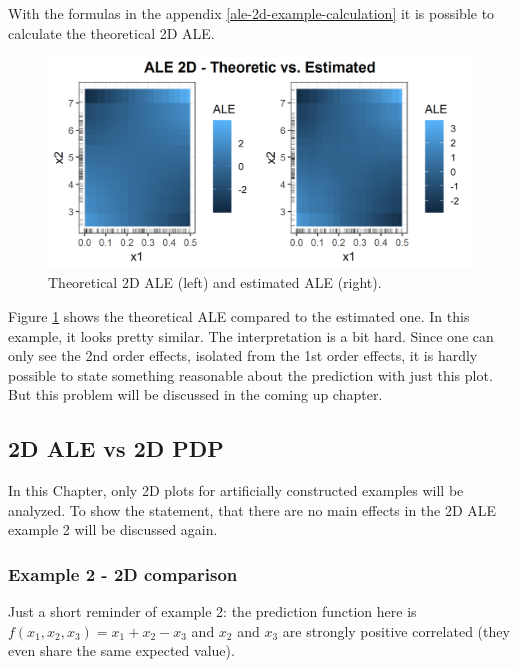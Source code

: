 \documentclass[
]{krantz}
\begin{document}
With the formulas in the appendix \ref{ale-2d-example-calculation} it is possible to calculate the theoretical 2D ALE.

\begin{figure}
\includegraphics[width=1\linewidth]{images/ale_1_ALE_2D_theo_vs_estim_x1x2x3_150_0_0p5_5_1} \caption{Theoretical 2D ALE (left) and estimated ALE (right).}\label{fig:theo2Dale}
\end{figure}



Figure \ref{fig:theo2Dale} shows the theoretical ALE compared to the estimated one. In this example, it looks pretty similar. The interpretation is a bit hard. Since one can only see the 2nd order effects, isolated from the 1st order effects, it is hardly possible to state something reasonable about the prediction with just this plot. But this problem will be discussed in the coming up chapter.

\hypertarget{d-ale-vs-2d-pdp}{%
\subsection{2D ALE vs 2D PDP}\label{d-ale-vs-2d-pdp}}

In this Chapter, only 2D plots for artificially constructed examples will be analyzed. To show the statement, that there are no main effects in the 2D ALE example 2 will be discussed again.

\hypertarget{example-2---2d-comparison}{%
\subsubsection{Example 2 - 2D comparison}\label{example-2---2d-comparison}}

Just a short reminder of example 2: the prediction function here is \(f(x_1, x_2, x_3) = x_1 + x_2 - x_3\) and \(x_2\) and \(x_3\) are strongly positive correlated (they even share the same expected value).
\end{document}
